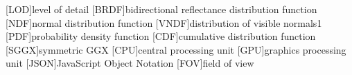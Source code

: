 [LOD]{level of detail}
[BRDF]{bidirectional reflectance distribution function}
[NDF]{normal distribution function}
[VNDF]{distribution of visible normals1}
[PDF]{probability density function}
[CDF]{cumulative distribution function}
[SGGX]{symmetric GGX}
[CPU]{central processing unit}
[GPU]{graphics processing unit}
[JSON]{JavaScript Object Notation}
[FOV]{field of view}
